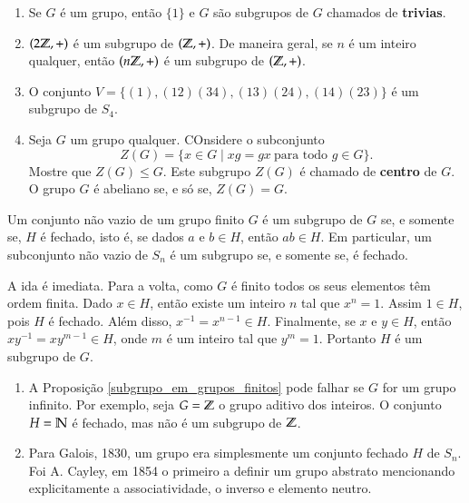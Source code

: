 \begin{exemplos}
	\begin{enumerate}[label=({\arabic*})]
		\item Se $G$ \'e um grupo, ent\~ao $\{1\}$ e $G$ s\~ao subgrupos de $G$ chamados de \textbf{trivias}.
		\item $(2\mathbb{Z},+)$ \'e um subgrupo de $(\mathbb{Z},+)$. De maneira geral, se $n$ \'e um inteiro qualquer, ent\~ao $(n\mathbb{Z},+)$ \'e um subgrupo de $(\mathbb{Z},+)$.
		\item O conjunto $V = \{(1), (12)(34), (13)(24), (14)(23)\}$ \'e um subgrupo de $S_4$.
		\item Seja $G$ um grupo qualquer. COnsidere o subconjunto
		\[
			Z(G) = \{x \in G \mid xg = gx\ \mbox{para todo } g \in G\}.
		\]
		Mostre que $Z(G) \le G$. Este subgrupo $Z(G)$ \'e chamado de \textbf{centro} de $G$. O grupo $G$ \'e abeliano se, e s\'o se, $Z(G) = G$.
	\end{enumerate}
\end{exemplos}

\begin{proposicao}\label{subgrupo_em_grupos_finitos}
	Um conjunto n\~ao vazio de um grupo finito $G$ \'e um subgrupo de $G$ se, e somente se, $H$ \'e fechado, isto \'e, se dados $a$ e $b \in H$, ent\~ao $ab \in H$. Em particular, um subconjunto n\~ao vazio de $S_n$ \'e um subgrupo se, e somente se, \'e fechado.
\end{proposicao}
\begin{prova}
	A ida \'e imediata. Para a volta, como $G$ \'e finito todos os seus elementos t\^em ordem finita. Dado $x \in H$, ent\~ao existe um inteiro $n$ tal que $x^n = 1$. Assim $1 \in H$, pois $H$ \'e fechado. Al\'em disso, $x^{-1} = x^{n - 1} \in H$. Finalmente, se $x$ e $y \in H$, ent\~ao $xy^{-1} = xy^{m - 1} \in H$, onde $m$ \'e um inteiro tal que $y^m = 1$. Portanto $H$ \'e um subgrupo de $G$.
\end{prova}

\begin{observacoes}
	\begin{enumerate}[label=({\arabic*})]
		\item A Proposi\c{c}\~ao \ref{subgrupo_em_grupos_finitos} pode falhar se $G$ for um grupo infinito. Por exemplo, seja $G = \mathbb{Z}$ o grupo aditivo dos inteiros. O conjunto $H = \mathbb{N}$ \'e fechado, mas n\~ao \'e um subgrupo de $\mathbb{Z}$.
		\item Para Galois, 1830, um grupo era simplesmente um conjunto fechado $H$ de $S_n$. Foi A. Cayley, em 1854 o primeiro a definir um grupo abstrato mencionando explicitamente a associatividade, o inverso e elemento neutro.
	\end{enumerate}
\end{observacoes}

